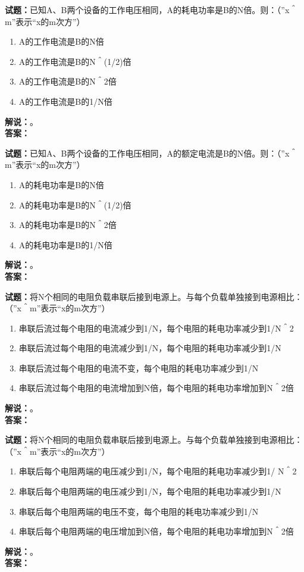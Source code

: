 \documentclass{ctexbook}
\begin{document}
\noindent\textbf{试题：}已知A、B两个设备的工作电压相同，A的耗电功率是B的N倍。则：（”x＾m”表示“x的m次方”）
\begin{enumerate}[leftmargin=3em]
  \item A的工作电流是B的N倍
  \item A的工作电流是B的N＾(1/2)倍
  \item A的工作电流是B的N＾2倍
  \item A的工作电流是B的1/N倍
\end{enumerate}
\noindent\textbf{解说：}\textbf{}。\\\noindent\textbf{答案：}

\vspace{\baselineskip}

\noindent\textbf{试题：}已知A、B两个设备的工作电压相同，A的额定电流是B的N倍。则：（”x＾m”表示“x的m次方”）
\begin{enumerate}[leftmargin=3em]
  \item A的耗电功率是B的N倍
  \item A的耗电功率是B的N＾(1/2)倍
  \item A的耗电功率是B的N＾2倍
  \item A的耗电功率是B的1/N倍
\end{enumerate}
\noindent\textbf{解说：}\textbf{}。\\\noindent\textbf{答案：}

\vspace{\baselineskip}

\noindent\textbf{试题：}将N个相同的电阻负载串联后接到电源上。与每个负载单独接到电源相比：（”x＾m”表示“x的m次方”）
\begin{enumerate}[leftmargin=3em]
  \item 串联后流过每个电阻的电流减少到1/N，每个电阻的耗电功率减少到1/N＾2
  \item 串联后流过每个电阻的电流减少到1/N，每个电阻的耗电功率减少到1/N
  \item 串联后流过每个电阻的电流不变，每个电阻的耗电功率减少到1/N
  \item 串联后流过每个电阻的电流增加到N倍，每个电阻的耗电功率增加到N＾2倍
\end{enumerate}
\noindent\textbf{解说：}\textbf{}。\\\noindent\textbf{答案：}

\vspace{\baselineskip}

\noindent\textbf{试题：}将N个相同的电阻负载串联后接到电源上。与每个负载单独接到电源相比：（”x＾m”表示“x的m次方”）
\begin{enumerate}[leftmargin=3em]
  \item 串联后每个电阻两端的电压减少到1/N，每个电阻的耗电功率减少到1/ N＾2
  \item 串联后每个电阻两端的电压减少到1/N，每个电阻的耗电功率减少到1/N
  \item 串联后每个电阻两端的电压不变，每个电阻的耗电功率减少到1/N
  \item 串联后每个电阻两端的电压增加到N倍，每个电阻的耗电功率增加到N＾2倍
\end{enumerate}
\noindent\textbf{解说：}\textbf{}。\\\noindent\textbf{答案：}
\end{document}
